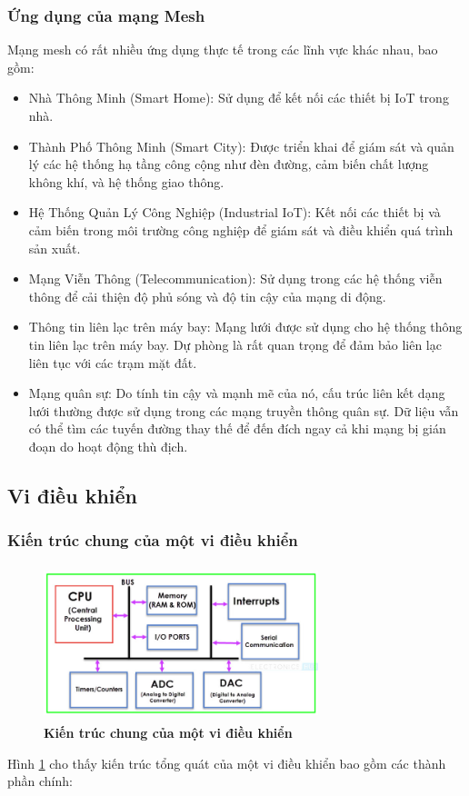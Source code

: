 \documentclass{article} %
\begin{document}
	\subsubsection{Ứng dụng của mạng Mesh}
	Mạng mesh có rất nhiều ứng dụng thực tế trong các lĩnh vực khác nhau, bao gồm:
	
	\begin{itemize}
		\item Nhà Thông Minh (Smart Home): Sử dụng để kết nối các thiết bị IoT trong nhà.
		\item Thành Phố Thông Minh (Smart City): Được triển khai để giám sát và quản lý các hệ thống hạ tầng công cộng như đèn đường, cảm biến chất lượng không khí, và hệ thống giao thông.
		\item Hệ Thống Quản Lý Công Nghiệp (Industrial IoT): Kết nối các thiết bị và cảm biến trong môi trường công nghiệp để giám sát và điều khiển quá trình sản xuất.
		\item Mạng Viễn Thông (Telecommunication): Sử dụng trong các hệ thống viễn thông để cải thiện độ phủ sóng và độ tin cậy của mạng di động.
		\item Thông tin liên lạc trên máy bay: Mạng lưới được sử dụng cho hệ thống thông tin liên lạc trên máy bay. Dự phòng là rất quan trọng để đảm bảo liên lạc liên tục với các trạm mặt đất.
		\item Mạng quân sự: Do tính tin cậy và mạnh mẽ của nó, cấu trúc liên kết dạng lưới thường được sử dụng trong các mạng truyền thông quân sự. Dữ liệu vẫn có thể tìm các tuyến đường thay thế để đến đích ngay cả khi mạng bị gián đoạn do hoạt động thù địch.
	\end{itemize}
	
	
	\subsection{Vi điều khiển}
	\subsubsection{Kiến trúc chung của một vi điều khiển}
	
	\begin{figure}[!ht]
		\centering
		\includegraphics[width=8cm,height=4.5cm]{Images/Armstructure.png}
		\caption[Kiến trúc chung của một vi điều khiển \cite{batatina2021aplikimi}]{\bfseries \fontsize{12pt}{0pt}\selectfont Kiến trúc chung của một vi điều khiển \cite{batatina2021aplikimi}}
		\label{Armstructure}
	\end{figure}
	\newpage
	Hình \ref{Armstructure} cho thấy kiến trúc tổng quát của một vi điều khiển bao gồm các thành phần chính:
	
\end{document}

